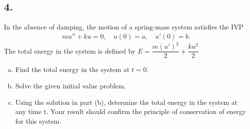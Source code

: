 \subsection*{4. }
In the absence of damping, the motion of a spring-mass system satisfies the IVP
\begin{align*}
	mu'' +ku=0, \quad u(0)=a, \quad u'(0)=b.
\end{align*}
The total energy in the system is defined by $E = \dfrac{m(u')^2}{2} + \dfrac{ku^2}{2}$
\begin{enumerate}[a)]
	\item Find the total energy in the system at $t=0$.
	\item Solve the given initial value problem.
	\item Using the solution in part (b), determine the total energy in the system at any time t. Your result should confirm the principle of conservation of energy for this system.
\end{enumerate}



